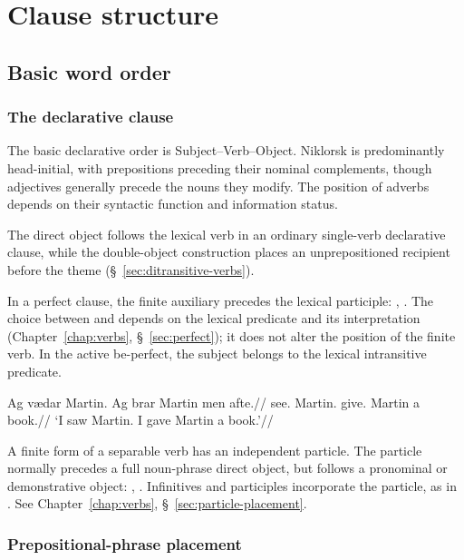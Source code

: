 \chapter{Clause structure}
\label{chap:syntax}

\section{Basic word order}

\subsection{The declarative clause}

The basic declarative order is Subject--Verb--Object. Niklorsk is predominantly head-initial, with prepositions preceding their nominal complements, though adjectives generally precede the nouns they modify. The position of adverbs depends on their syntactic function and information status.

The direct object follows the lexical verb in an ordinary single-verb declarative clause, while the double-object construction places an unprepositioned recipient before the theme (\S~\ref{sec:ditransitive-verbs}).

In a perfect clause, the finite auxiliary precedes the lexical participle: , . The choice between  and  depends on the lexical predicate and its interpretation (Chapter~\ref{chap:verbs}, \S~\ref{sec:perfect}); it does not alter the position of the finite verb. In the active be-perfect, the subject belongs to the lexical intransitive predicate.

\pex
\begingl
\gla Ag vædar Martin. Ag brar Martin men afte.//
\glb \First{}\Sg{} see.\Pst{} Martin.
      \First{}\Sg{} give.\Pst{} Martin a book.//
\glft `I saw Martin. I gave Martin a book.'//
\endgl
\xe

A finite form of a separable verb has an independent particle. The particle normally precedes a full noun-phrase direct object, but follows a pronominal or demonstrative object: , . Infinitives and participles incorporate the particle, as in . See Chapter~\ref{chap:verbs}, \S~\ref{sec:particle-placement}.

\subsection{Prepositional-phrase placement}
\label{sec:pp-placement}


